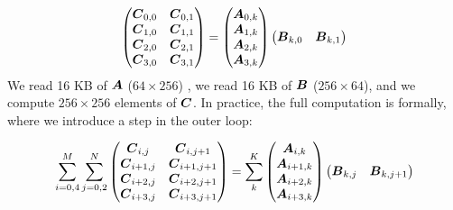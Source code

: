 \documentclass[conference]{IEEEtran}
\begin{document}
{\small \begin{equation}
  \label{eq:gemmB}
  \begin{pmatrix}
    \Vc{C}_{0,0}  & \Vc{C}_{0,1}  \\
    \Vc{C}_{1,0}  & \Vc{C}_{1,1}    \\
    \Vc{C}_{2,0}  & \Vc{C}_{2,1}  \\
    \Vc{C}_{3,0}  & \Vc{C}_{3,1} \\
  \end{pmatrix}    =
  \begin{pmatrix}
    \Vc{A}_{0,k}  \\
    \Vc{A}_{1,k}  \\
    \Vc{A}_{2,k}  \\
    \Vc{A}_{3,k}  \\
  \end{pmatrix}  
  \begin{pmatrix}
    \Vc{B}_{k,0}  &  \Vc{B}_{k,1}  \\
  \end{pmatrix}    
\end{equation}
} We read 16 KB of ${\boldsymbol A}$ ($64 \times 256$) , we read 16 KB of
${\boldsymbol B}$ ($256 \times 64$), and we compute $256 \times 256$ elements
of ${\boldsymbol C}$. In practice, the full computation is formally, where we
introduce a step in the outer loop: 

{\small \begin{equation*}
    \sum_{i=0,4}^M
    \sum_{j=0,2}^N
  \begin{pmatrix}
    {\boldsymbol C}_{i,j}  & {\boldsymbol C}_{i,  j+1}  \\
    {\boldsymbol C}_{i+1,j} & {\boldsymbol C}_{i+1,j+1} \\
    {\boldsymbol C}_{i+2,j} & {\boldsymbol C}_{i+2,j+1} \\
    {\boldsymbol C}_{i+3,j} & {\boldsymbol C}_{i+3,j+1} \\ 
  \end{pmatrix}    = \sum_k^K
  \begin{pmatrix}
    {\boldsymbol A}_{i,  k}  \\
    {\boldsymbol A}_{i+1,k}   \\
    {\boldsymbol A}_{i+2,k}  \\
    {\boldsymbol A}_{i+3,k}   \\
  \end{pmatrix}  
  \begin{pmatrix}
    {\boldsymbol B}_{k,j}  &  {\boldsymbol B}_{k,j+1} \\
  \end{pmatrix}    
\end{equation*}
}
\end{document}
